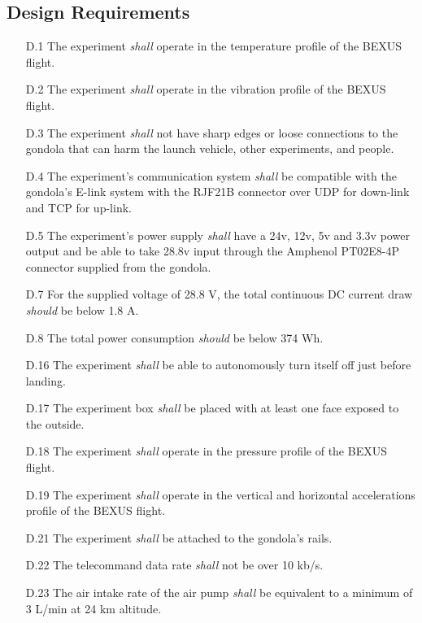 \subsection{Design Requirements}

\begin{enumerate}
    \item[D.1] The experiment \textit{shall} operate in the temperature profile of the BEXUS flight\cite{BexusManual}.
    \item[D.2] The experiment \textit{shall} operate in the vibration profile of the BEXUS flight\cite{BexusManual}.
    \item[D.3] The experiment \textit{shall} not have sharp edges or loose connections to the gondola that can harm the launch vehicle, other experiments, and people.%
    \item[D.4] The experiment's communication system \textit{shall} be compatible with the gondola's E-link system with the RJF21B connector over UDP for down-link and TCP for up-link.
    \item[D.5] The experiment's power supply \textit{shall} have a 24v, 12v, 5v and 3.3v power output and be able to take 28.8v input through the Amphenol PT02E8-4P connector supplied from the gondola. 
    \item[D.7] For the supplied voltage of 28.8 V, the total continuous DC current draw \textit{should} be below 1.8 A.
    \item[D.8] The total power consumption \textit{should} be below 374 Wh.
    \item[D.16] The experiment \textit{shall} be able to autonomously turn itself off just before landing.
    \item[D.17] The experiment box \textit{shall} be placed with at least one face exposed to the outside.
    \item[D.18] The experiment \textit{shall} operate in the pressure profile of the BEXUS flight\cite{BexusManual}.
    \item[D.19] The experiment \textit{shall} operate in the vertical and horizontal accelerations profile of the BEXUS flight\cite{BexusManual}.
    \item[D.21] The experiment \textit{shall} be attached to the gondola's rails.
    \item[D.22] The telecommand data rate \textit{shall} not be over 10 kb/s.
    \item[D.23] The air intake rate of the air pump \textit{shall} be equivalent to a minimum of 3 L/min at 24 km altitude.

\end{enumerate}

